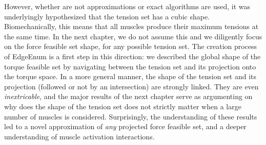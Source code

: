However, whether are not approximations or exact algorithms are used, it was underlyingly hypothesized that the tension set has a cubic shape. Biomechanically, this means that all muscles produce their maximum tensions at the same time. In the next chapter, we do not assume this and we diligently focus on the force feasible set shape, for any possible tension set. The creation process of EdgeEnum is a first step in this direction: we described the global shape of the torque feasible set by navigating between the tension set and its projection onto the torque space. In a more general manner, the shape of the tension set and its projection (followed or not by an intersection) are strongly linked. They are even \emph{inextricable}, and the major results of the next chapter serve as argumenting on why does the shape of the tension set does not strictly matter when a large number of muscles is considered. Surprisingly, the understanding of these results led to a novel approximation of \emph{any} projected force feasible set, and a deeper understanding of muscle activation interactions.